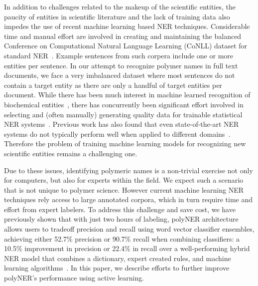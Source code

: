 In addition to challenges related to the makeup of the scientific entities, the paucity of entities in scientific literature and the lack of training data also impedes the use of recent machine learning based NER techniques.
Considerable time and manual effort are involved in creating and maintaining the balanced
Conference on Computational Natural Language Learning (CoNLL) dataset for standard NER~\cite{tjong2003introduction}.
Example sentences from such corpera include one or more entities per sentence. 
In our attempt to recognize polymer names in full text documents, we face a very imbalanced dataset where most sentences do not contain a target entity as there are only a handful of target entities per document.
While there has been much interest in machine learned recognition of biochemical entities~\cite{jessop2011oscar4,rocktaschel2012chemspot,leaman2015tmchem,swain2016chemdataextractor}, there has concurrently been significant effort involved in selecting and (often manually) generating quality data for
trainable statistical NER systems~\cite{krallinger2015chemdner}. 
Previous work has also found that even state-of-the-art NER systems do
not typically perform well when applied to different domains~\cite{krallinger2013overview}. 
Therefore the problem of training machine learning models for recognizing new scientific entities remains a challenging one.

Due to these issues, identifying polymeric names is a non-trivial exercise not only for computers, but also for experts within the field. 
We expect such a scenario that is not unique to polymer science.
However current machine learning NER techniques rely access to large annotated corpora, which in turn require time and effort from expert labelers.
To address this challenge and save cost,
we have previously shown that with just two hours of labeling, polyNER architecture allows users to tradeoff precision and recall using word vector classifier ensembles, achieving
either 52.7\% precision or 90.7\% recall when combining classifiers:
a 10.5\% improvement in precision or 22.4\% in recall over a well-performing hybrid NER model
that combines a dictionary, expert created rules, and machine learning algorithms~\cite{tchoua2019polyner}. 
In this paper, we describe efforts to further improve polyNER's performance using active learning.
